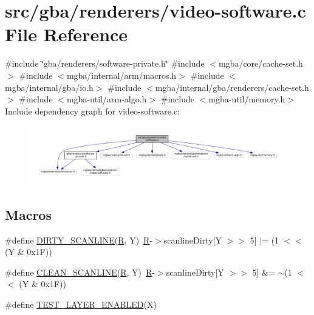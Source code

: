 \hypertarget{video-software_8c}{}\section{src/gba/renderers/video-\/software.c File Reference}
\label{video-software_8c}
{\ttfamily \#include \char`\"{}gba/renderers/software-\/private.\+h\char`\"{}}\newline
{\ttfamily \#include $<$mgba/core/cache-\/set.\+h$>$}\newline
{\ttfamily \#include $<$mgba/internal/arm/macros.\+h$>$}\newline
{\ttfamily \#include $<$mgba/internal/gba/io.\+h$>$}\newline
{\ttfamily \#include $<$mgba/internal/gba/renderers/cache-\/set.\+h$>$}\newline
{\ttfamily \#include $<$mgba-\/util/arm-\/algo.\+h$>$}\newline
{\ttfamily \#include $<$mgba-\/util/memory.\+h$>$}\newline
Include dependency graph for video-\/software.c\+:
\nopagebreak
\begin{figure}[H]
\begin{center}
\leavevmode
\includegraphics[width=350pt]{video-software_8c__incl}
\end{center}
\end{figure}
\subsection*{Macros}
\begin{DoxyCompactItemize}
\item 
\#define \mbox{\hyperlink{video-software_8c_aa31b1a31e923ffc3e630f105c0a4d218}{D\+I\+R\+T\+Y\+\_\+\+S\+C\+A\+N\+L\+I\+NE}}(\mbox{\hyperlink{_sha256_8c_ae076917a1bc8cbea6ed0af47d7c897fe}{R}},  Y)~\mbox{\hyperlink{_sha256_8c_ae076917a1bc8cbea6ed0af47d7c897fe}{R}}-\/$>$scanline\+Dirty\mbox{[}Y $>$$>$ 5\mbox{]} $\vert$= (1 $<$$<$ (Y \& 0x1\+F))
\item 
\#define \mbox{\hyperlink{video-software_8c_a087b8a593da2195f587787e34d25137d}{C\+L\+E\+A\+N\+\_\+\+S\+C\+A\+N\+L\+I\+NE}}(\mbox{\hyperlink{_sha256_8c_ae076917a1bc8cbea6ed0af47d7c897fe}{R}},  Y)~\mbox{\hyperlink{_sha256_8c_ae076917a1bc8cbea6ed0af47d7c897fe}{R}}-\/$>$scanline\+Dirty\mbox{[}Y $>$$>$ 5\mbox{]} \&= $\sim$(1 $<$$<$ (Y \& 0x1\+F))
\item 
\#define \mbox{\hyperlink{video-software_8c_a37efa221ca9eb62b754a8177fdff392a}{T\+E\+S\+T\+\_\+\+L\+A\+Y\+E\+R\+\_\+\+E\+N\+A\+B\+L\+ED}}(X)
\end{DoxyCompactItemize}
